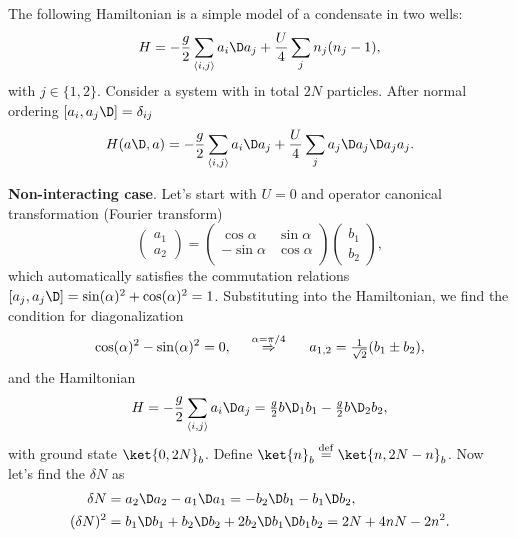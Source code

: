 The following Hamiltonian is a simple model of a condensate in two wells:
\begin{equation}
	H = - \frac{g}{2} \sum_{\langle i,j\rangle} a_i\D a_j + \frac{U}{4} \sum_{j} n_j (n_j-1),
\end{equation}
with $j \in \{1,2\}$. Consider a system with in total $2N$ particles. After normal ordering $[a_i, a_j\D]=\delta_{ij}$
\begin{equation*}
	H(a\D, a) = - \frac{g}{2} \sum_{\langle i,j\rangle} a_i\D a_j  + \frac{U}{4} \sum_{j} a_j\D a_j\D a_j a_j.
\end{equation*}


\textbf{Non-interacting case}. Let's start with $U=0$ and operator canonical transformation (Fourier transform)
\begin{equation*}
	\begin{pmatrix}
		a_1 \\ a_2
	\end{pmatrix} = \begin{pmatrix}
	    \cos \alpha & \sin \alpha \\
	    - \sin \alpha & \cos \alpha \\
	\end{pmatrix} 
	\begin{pmatrix}
		b_1 \\ b_2
	\end{pmatrix},
\end{equation*}
which automatically satisfies the commutation relations $[a_j, a_j\D] = \sin (\alpha)^2 + \cos (\alpha)^2 = 1$. Substituting into the Hamiltonian, we find the condition for diagonalization
\begin{equation*}
	\cos (\alpha)^2 - \sin(\alpha)^2 = 0,
	\hspace{0.5cm} \overset{\alpha=\pi/4}{\Rightarrow}  \hspace{0.5cm}
	a_{1,2} = \tfrac{1}{\sqrt{2}}(b_1 \pm b_2),
\end{equation*}
and the Hamiltonian
\begin{equation}
	H = - \frac{g}{2} \sum_{\langle i,j\rangle} a_i\D a_j =  \tfrac{g}{2} b\D_1 b_1 - \tfrac{g}{2} b\D_2 b_2,
	\label{eq1212}
\end{equation}
with ground state $\ket{0,2N}_b$. Define $\ket{n}_b \overset{\mathrm{def}}{=} \ket{n,2N-n}_b$. Now let's find the $\delta N$ as
\begin{align*}
	\delta N &= a_2\D a_2 - a_1\D a_1 = - b_2\D b_1 - b_1\D b_2,\\
	(\delta N)^2 &= b_1\D b_1 + b_2\D b_2 + 2 b_2\D b_1\D b_1 b_2 = 2N + 4 nN - 2n^2.
\end{align*}
